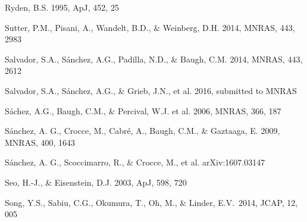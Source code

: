 \documentclass[iop]{emulateapj}
\begin{document}
\begin{thebibliography}{}


Ryden, B.S. 1995, ApJ, 452, 25  



Sutter, P.M., Pisani, A., Wandelt, B.D., \& Weinberg, D.H. 2014, MNRAS, 443, 2983

Salvador, S.A., S\'{a}nchez, A.G., Padilla, N.D., \& Baugh, C.M. 2014, MNRAS, 443, 2612

Salvador, S.A., S\'{a}nchez, A.G., \& Grieb, J.N., et al. 2016, submitted to MNRAS

S\'{a}chez, A.G., Baugh, C.M., \& Percival, W.J. et al. 2006, MNRAS, 366, 187

S\'{a}nchez, A. G., Crocce, M., Cabr\'{e}, A., Baugh, C.M., \& Gaztaaga, E. 2009, MNRAS, 400, 1643

S\'{a}nchez, A. G., Scoccimarro, R., \& Crocce, M., et al.
arXiv:1607.03147






Seo, H.-J., \& Eisenstein, D.J. 2003, ApJ, 598, 720



Song, Y.S., Sabiu, C.G., 
Okumura, T., Oh, M., \& Linder, E.V.\ 2014, JCAP, 12, 005 


\end{thebibliography}
\end{document}
